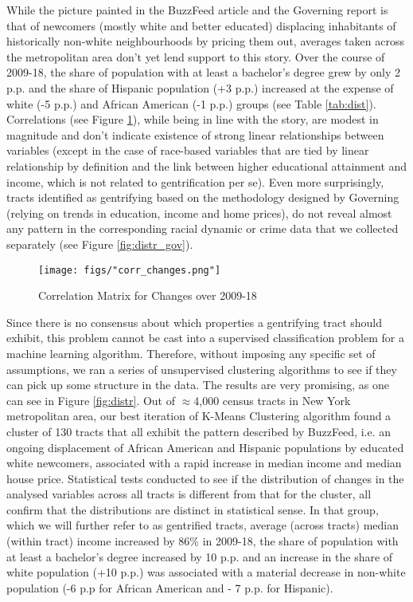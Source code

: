 \documentclass[a4paper, 12pt]{article}
\numberwithin{equation}{section}
\begin{document}
		While the picture painted in the BuzzFeed article and the Governing report is that of newcomers (mostly white and better educated) displacing inhabitants of historically non-white neighbourhoods by pricing them out, averages taken across the metropolitan area don't yet lend support to this story. Over the course of 2009-18, the share of population with at least a bachelor's degree grew by only 2 p.p. and the share of Hispanic population (+3 p.p.) increased at the expense of white (-5 p.p.) and African American (-1 p.p.) groups (see Table \ref{tab:dist}). Correlations (see Figure \ref{fig:corr}), while being in line with the story, are modest in magnitude and don't indicate existence of strong linear relationships between variables (except in the case of race-based variables that are tied by linear relationship by definition and the link between higher educational attainment and income, which is not related to gentrification per se). Even more surprisingly, tracts identified as gentrifying based on the methodology designed by Governing \cite{Governing15} (relying on trends in education, income and home prices), do not reveal almost any pattern in the corresponding racial dynamic or crime data that we collected separately (see Figure \ref{fig:distr_gov}). \\
		
			\begin{figure}[H]
				\centering
				\texttt{[image: figs/"corr\_changes.png"]}
				\caption{Correlation Matrix for Changes over 2009-18}
				\label{fig:corr}
			\end{figure}
		
		Since there is no consensus about which properties a gentrifying tract should exhibit, this problem cannot be cast into a supervised classification problem for a machine learning algorithm. Therefore, without imposing any specific set of assumptions, we ran a series of unsupervised clustering algorithms to see if they can pick up some structure in the data. The results are very promising, as one can see in Figure \ref{fig:distr}. Out of $\approx$4,000 census tracts in New York metropolitan area, our best iteration of K-Means Clustering algorithm found a cluster of 130 tracts that all exhibit the pattern described by BuzzFeed, i.e. an ongoing displacement of African American and Hispanic populations by educated white newcomers, associated with a rapid increase in median income and median house price. Statistical tests conducted to see if the distribution of changes in the analysed variables across all tracts is different from that for the cluster, all confirm that the distributions are distinct in statistical sense. In that group, which we will further refer to as gentrified tracts, average (across tracts) median (within tract) income increased by 86\% in 2009-18, the share of population with at least a bachelor's degree increased by 10 p.p. and an increase in the share of white population (+10 p.p.) was associated with a material decrease in non-white population (-6 p.p for African American and - 7 p.p. for Hispanic).
		
\end{document}
